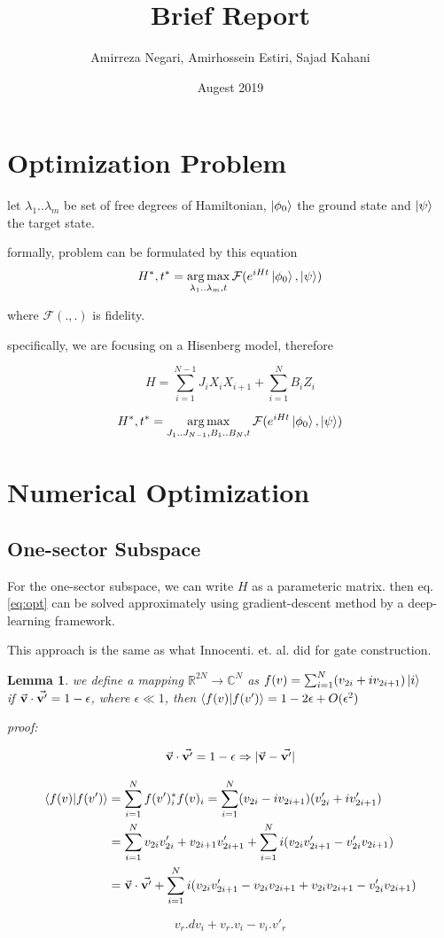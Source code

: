 \documentclass{article}
\title{Brief Report}
\author{Amirreza Negari, Amirhossein Estiri, Sajad Kahani}
\date{Augest 2019}
\DeclareMathOperator*{\argmax}{arg\,max}
\begin{document}
\maketitle

\section{Optimization Problem}
let ${\lambda_1..\lambda_m}$ be set of free degrees of Hamiltonian, $\ket{\phi_0}$ the ground state and $\ket{\psi}$ the target state.

formally, problem can be formulated by this equation
\[ H^*, t^* = \argmax_{\lambda_1..\lambda_m, t} \mathcal{F}(e^{iHt} \ket{\phi_0}, \ket{\psi}) \]

where $\mathcal{F}(., .)$ is fidelity.

specifically, we are focusing on a Hisenberg model, therefore

\[ H = \sum_{i=1}^{N-1} J_i X_i X_{i+1} + \sum_{i=1}^N B_i Z_i\]

\begin{equation} 
\label{eq:opt}
H^*, t^* = \argmax_{J_1..J_{N-1}, B_1..B_N, t} \mathcal{F}(e^{iHt} \ket{\phi_0}, \ket{\psi})
\end{equation}

\section{Numerical Optimization}
\subsection{One-sector Subspace}
For the one-sector subspace, we can write $H$ as a parameteric matrix. then eq. \ref{eq:opt} can be solved approximately using gradient-descent method by a deep-learning framework.

This approach is the same as what Innocenti. et. al. did for gate construction.


\newtheorem{lemma}{Lemma}
\begin{lemma}
we define a mapping $\mathbb{R}^{2N} \rightarrow \mathbb{C}^{N}$ as $f(v) = \sum_{i=1}^N (v_{2i} + iv_{2i+1}) \ket{i}$ \\
if $\va{v}\cdot\va{v'} = 1 - \epsilon$, where $\epsilon \ll 1$, then $\braket{f(v)}{f(v')} = 1 - 2\epsilon + O(\epsilon^2)$

proof:

\[ \va{v}\cdot\va{v'} = 1 - \epsilon \Rightarrow |\va{v} - \va{v'}|\]

\begin{align*} \braket{f(v)}{f(v')} &= \sum_{i=1}^N f(v')_i^* f(v)_i = \sum_{i=1}^N (v_{2i} - iv_{2i+1}) (v'_{2i} + iv'_{2i+1}) \\
& = \sum_{i=1}^N v_{2i}v'_{2i} + v_{2i+1}v'_{2i+1} +  \sum_{i=1}^N i(v_{2i}v'_{2i+1} - v'_{2i}v_{2i+1}) \\
& = \va{v}\cdot\va{v'} + \sum_{i=1}^N i(v_{2i}v'_{2i+1} - v_{2i}v_{2i+1} + v_{2i}v_{2i+1}- v'_{2i}v_{2i+1}) \end{align*}

\[ v_r.dv_i + v_r.v_i - v_i.v'_r \]

\end{lemma}
\end{document}
